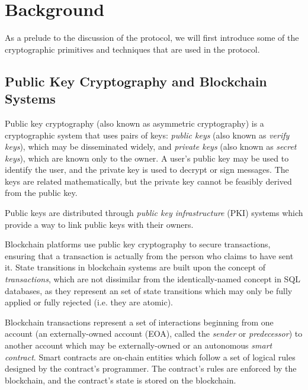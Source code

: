 \chapter{Background}\label{background}

As a prelude to the discussion of the protocol, we will first introduce some of the cryptographic primitives and techniques that are used in the protocol.

\section{Public Key Cryptography and Blockchain Systems}\label{public-key-cryptography-and-blockchain-systems}

Public key cryptography (also known as asymmetric cryptography) is a cryptographic system that uses pairs of keys: \emph{public keys} (also known as \emph{verify keys}), which may be disseminated widely, and \emph{private keys} (also known as \emph{secret keys}), which are known only to the owner. A user's public key may be used to identify the user, and the private key is used to decrypt or sign messages. The keys are related mathematically, but the private key cannot be feasibly derived from the public key.

Public keys are distributed through \emph{public key infrastructure} (PKI) systems which provide a way to link public keys with their owners.

Blockchain platforms use public key cryptography to secure transactions, ensuring that a transaction is actually from the person who claims to have sent it. State transitions in blockchain systems are built upon the concept of \emph{transactions}, which are not dissimilar from the identically-named concept in SQL databases, as they represent an set of state transitions which may only be fully applied or fully rejected (i.e. they are atomic).

Blockchain transactions represent a set of interactions beginning from one account (an externally-owned account (EOA), called the \emph{sender} or \emph{predecessor}) to another account which may be externally-owned or an autonomous \emph{smart contract}. Smart contracts are on-chain entities which follow a set of logical rules designed by the contract's programmer. The contract's rules are enforced by the blockchain, and the contract's state is stored on the blockchain.

\bigskip

